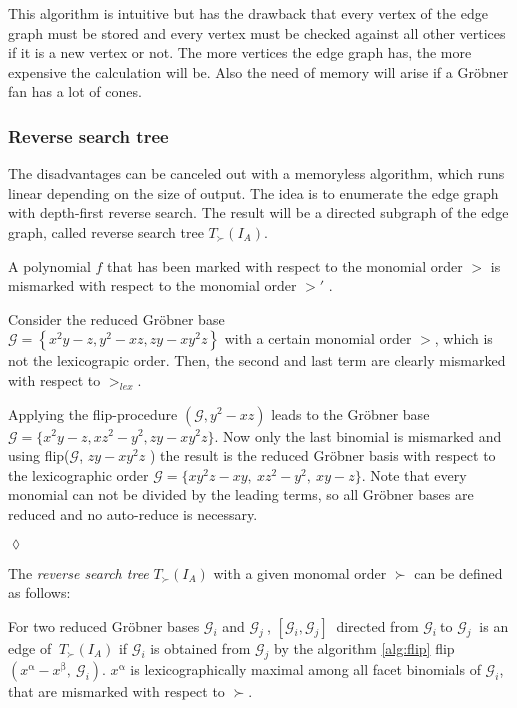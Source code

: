 This algorithm is intuitive but has the drawback that every vertex of the edge graph must be stored and every vertex must be checked against all other vertices if it is a new vertex or not. 
The more vertices the edge graph has, the more expensive the calculation will be. Also the need of memory will arise if a Gröbner fan has a lot of cones.
 
 \newpage

\subsubsection{Reverse search tree}
The disadvantages can be canceled out with a memoryless algorithm, which runs linear depending on the size of output. The idea is to enumerate the edge graph with depth-first reverse search. The result will be a directed subgraph of the edge graph, called reverse search tree $T_{\succ}(I_{A}) $.\\
\begin{env_definition}
\cite{tigers}
A polynomial $f$ that has been marked with respect to the monomial order $>$  is mismarked with respect to the monomial order $>'$  .
\end{env_definition}

\begin{env_example}\normalfont
Consider the reduced Gröbner base \\ $\mathcal{G} = \left\lbrace x^{2}y-z,y^{2}-xz, zy-xy^{2}z \right\rbrace $ 
with a certain monomial order $>$, which is not the lexicograpic order.
Then, the second and last term are clearly mismarked with respect to $>_{lex}$.

Applying the flip-procedure $(\mathcal{G},y^{2}-xz)$ leads to the Gröbner base $\mathcal{G} = \{x^{2}y-z,xz^{2}-y^{2}, zy-xy^{2}z \} $. Now only the last binomial is mismarked and using flip($\mathcal{G}$, $zy-xy^{2}z$ ) the result is the reduced Gröbner basis with respect to the lexicographic order $\mathcal{G} = \{xy^{2}z -xy,~xz^{2}-y^{2},~xy-z \} $. Note that every monomial can not be divided by the leading terms, so all Gröbner bases are reduced and no auto-reduce is necessary.
 
\begin{flushright}
$\lozenge$
\end{flushright} 
\end{env_example}


The \textit{reverse search tree} $T_{\succ}(I_{A}) $ with a given monomal order $ \succ $ can be defined as follows:
\begin{env_definition}
\label{def:reverse}
\cite{tigers} For two reduced Gröbner bases $\mathcal{G}_{i}$ and $\mathcal{G}_{j}~$, $[\mathcal{G}_{i},\mathcal{G}_{j} ]~$ directed from $\mathcal{G}_{i}~$to $\mathcal{G}_{j}~$ is an edge of $~T_{\succ}(I_{A}) $ if $\mathcal{G}_{i}$ is obtained from $\mathcal{G}_{j}$ by the algorithm \ref{alg:flip} flip$(x^{\upalpha} - x^{\upbeta},~\mathcal{G}_{i}).$ $x^{\upalpha}$ is lexicographically maximal among all facet binomials of $\mathcal{G}_{i}$, that are mismarked with respect to $\succ$.
\end{env_definition}


